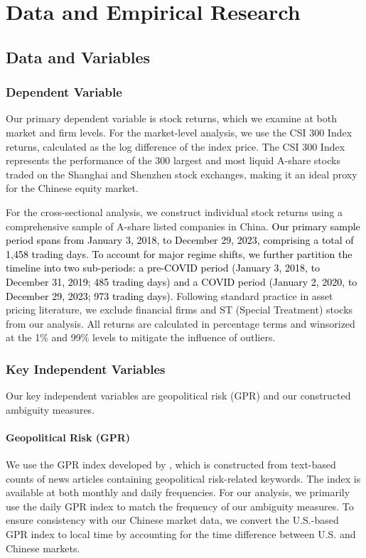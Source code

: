 \documentclass[preprint,12pt,authoryear]{elsarticle}
\begin{document}
\section{Data and Empirical Research}
\label{sec:data}

\subsection{Data and Variables}

\subsubsection{Dependent Variable}

Our primary dependent variable is stock returns, which we examine at both market and firm levels. For the market-level analysis, we use the CSI 300 Index returns, calculated as the log difference of the index price. The CSI 300 Index represents the performance of the 300 largest and most liquid A-share stocks traded on the Shanghai and Shenzhen stock exchanges, making it an ideal proxy for the Chinese equity market.

For the cross-sectional analysis, we construct individual stock returns using a comprehensive sample of A-share listed companies in China.  \textcolor{black}{Our primary sample period spans from January 3, 2018, to December 29, 2023, comprising a total of 1,458 trading days. To account for major regime shifts, we further partition the timeline into two sub-periods: a pre-COVID period (January 3, 2018, to December 31, 2019; 485 trading days) and a COVID period (January 2, 2020, to December 29, 2023; 973 trading days).} Following standard practice in asset pricing literature, we exclude financial firms and ST (Special Treatment) stocks from our analysis. All returns are calculated in percentage terms and winsorized at the 1\% and 99\% levels to mitigate the influence of outliers.



\subsubsection{Key Independent Variables}

Our key independent variables are geopolitical risk (GPR) and our constructed ambiguity measures.

\paragraph{Geopolitical Risk (GPR)}
We use the GPR index developed by \citet{Caldara2022}, which is constructed from text-based counts of news articles containing geopolitical risk-related keywords. The index is available at both monthly and daily frequencies. For our analysis, we primarily use the daily GPR index to match the frequency of our ambiguity measures. To ensure consistency with our Chinese market data, we convert the U.S.-based GPR index to local time by accounting for the time difference between U.S. and Chinese markets.
\end{document}
